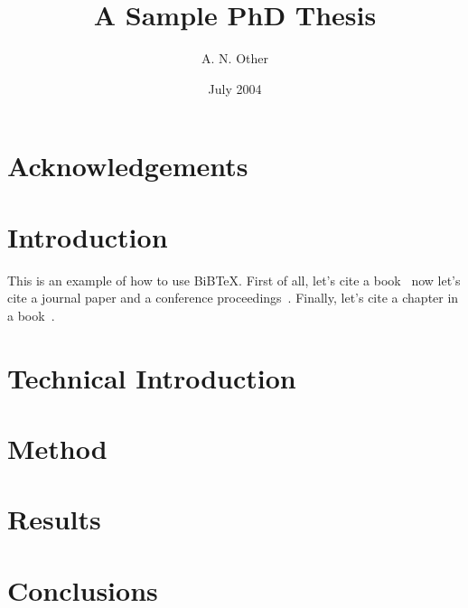 \documentclass[a4paper]{report}
\begin{document}
\title{A Sample PhD Thesis}
\author{A. N. Other}
\date{July 2004}

\maketitle

\tableofcontents
\listoffigures
\listoftables

\chapter*{Acknowledgements}

\begin{abstract}
\end{abstract}


\chapter{Introduction}
\label{ch:intro}

This is an example of how to use BiB\TeX.
First of all, let's cite a book~\cite{wainwright93}
now let's cite a journal paper and a conference proceedings~\cite{cawley96,talbot97}.
Finally, let's cite a chapter in a book~\cite[Chapter 9]{goossens97}.

\chapter{Technical Introduction}
\label{ch:techintro}

\chapter{Method}
\label{ch:method}

\chapter{Results}
\label{ch:results}

\chapter{Conclusions}
\label{ch:conc}



\end{document}
